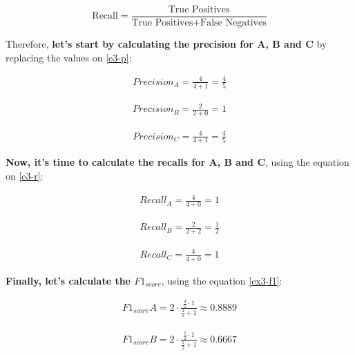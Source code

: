 \documentclass[12pt]{article}
\begin{document}
\begin{enumerate}[leftmargin=\labelsep]
    \begin{equation}\label{e3-r}
        \text{Recall} = \frac{\text{True Positives}}{{\text{True Positives} + \text{False Negatives}}}
    \end{equation}

    Therefore, \textbf{let's start by calculating the precision for A, B and C} by replacing the values on \eqref{e3-p}:

    \[
        \begin{aligned}
            Precision_A = \frac{4}{4+1} = \frac{4}{5}
        \end{aligned}
    \]

    \[
        \begin{aligned}
            Precision_B = \frac{2}{2+0} = 1
        \end{aligned}
    \]

    \[
        \begin{aligned}
            Precision_C = \frac{4}{4+1} = \frac{4}{5}
        \end{aligned}
    \]


    \textbf{Now, it's time to calculate the recalls for A, B and C}, using the equation on \eqref{e3-r}:

    \[
        \begin{aligned}
            Recall_A = \frac{4}{4+0} = 1
        \end{aligned}
    \]

    \[
        \begin{aligned}
            Recall_B = \frac{2}{2+2} = \frac{1}{2}
        \end{aligned}
    \]

    \[
        \begin{aligned}
            Recall_C = \frac{4}{4+0} = 1
        \end{aligned}
    \]

    \textbf{Finally, let's calculate the $F1_{score}$}, using the equation \eqref{ex3-f1}:

    \[
        \begin{aligned}
            F1_{score} A = 2 \cdot \frac{{ \frac{4}{5} \cdot 1 }}{{ \frac{4}{5} + 1 }} \approx 0.8889
        \end{aligned}
    \]

    \[
        \begin{aligned}
            F1_{score} B = 2 \cdot \frac{{ \frac{1}{2} \cdot 1 }}{{ \frac{1}{2} + 1 }} \approx 0.6667
        \end{aligned}
    \]


\end{enumerate}
\end{document}
